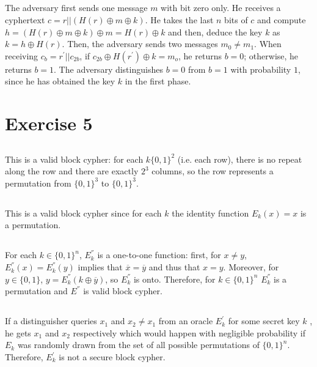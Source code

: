 \documentclass{article}
\begin{document}
\subsection{}
The adversary first sends one message $m$ with bit zero only. He receives a cyphertext $c=r||(H(r) \oplus m \oplus k)$. He takes the last $n$ bits of $c$ and compute $h = (H(r) \oplus m \oplus k) \oplus m = H(r)\oplus k$ and then, deduce the key $k$ as $k=h \oplus H(r)$. Then, the adversary sends two messages $m_{0}\neq m_{1}$. When receiving $c_{b}=r^{'} ||c_{2b}$, if $c_{2b}\oplus H(r^{'})\oplus k = m_{o}$, he returns $b=0$; otherwise, he returns $b=1$. The adversary distinguishes $b=0$ from $b=1$ with probability $1$, since he has obtained the key $k$ in the first phase. 

\section{Exercise 5}

\subsection{}
This is a valid block cypher: for each $k\{0,1\}^{2}$ (i.e. each row), there is no repeat along the row and there are exactly $2^{3}$ columns, so the row represents a permutation from $\{0,1\}^{3}$ to $\{0,1\}^{3}$. 

\subsection{}
This is a valid block cypher since for each $k$ the identity function $E_{k}(x)=x$ is a permutation.

\subsection{}
For each $k\in \{0,1\}^{n}$, $E_{k}^{''}$ is a one-to-one function: first, for $x\neq y$, $E_{k}^{''}(x) = E_{k}^{''}(y)$ implies that $\overline{x} = \overline{y}$ and thus that $x=y$. Moreover, for $y\in \{0,1\}$, $y= E_{k}^{''}(k\oplus \overline{y})$, so $E_{k}^{''}$ is onto. Therefore, for $k\in \{0,1\}^{n}$ $E_{k}^{''}$ is a permutation and $E^{''}$ is valid block cypher. 

\subsection{}
If a distinguisher queries $x_{1}$ and $x_{2}\neq x_{1}$ from an oracle $E^{'}_{k}$ for some secret key $k$ , he gets $x_{1}$ and $x_{2}$ respectively which would happen with negligible probability if $E_{k}$ was randomly drawn from the set of all possible permutations of $\{0, 1\}^{n}$. Therefore, $E_{k}^{'}$ is not a secure block cypher.
\end{document}
